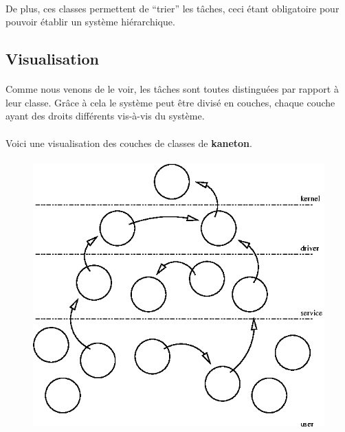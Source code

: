 \documentclass[10pt,a4wide]{article}
\begin{document}
\paragraph{}

De plus, ces classes permettent de ``trier'' les t\^aches, ceci \'etant
obligatoire pour pouvoir \'etablir un syst\`eme hi\'erarchique.

\subsection{Visualisation}

\paragraph{}

Comme nous venons de le voir, les t\^aches sont toutes distingu\'ees par
rapport \`a leur classe. Gr\^ace \`a cela le syst\`eme peut \^etre divis\'e
en couches, chaque couche ayant des droits diff\'erents vis-\`a-vis du
syst\`eme.

\paragraph{}

Voici une visualisation des couches de classes de \textbf{kaneton}.

\paragraph{}

\begin{figure}[h]
\centerline{\includegraphics{figures/classes.eps}}
\end{figure}
\end{document}

